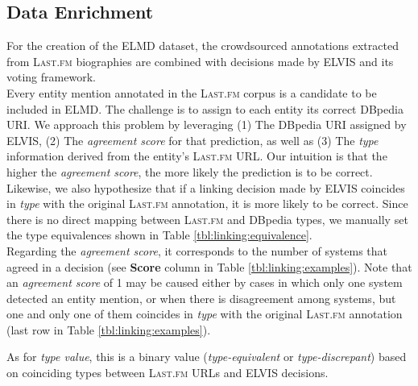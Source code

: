 


\subsection{Data Enrichment}
\label{sec:linking:enrichment}

For the creation of the ELMD dataset, the crowdsourced annotations extracted from \textsc{Last.fm} biographies are combined with decisions made by \textsc{ELVIS} and its voting framework.\\%

Every entity mention annotated in the \textsc{Last.fm} corpus is a candidate to be included in \textsc{ELMD}. The challenge is to assign to each entity its correct DBpedia URI. We approach this problem by leveraging (1) The DBpedia URI assigned by \textsc{ELVIS}, (2) The \textit{agreement score} for that prediction, as well as (3) The \textit{type} information derived from the entity's \textsc{Last.fm} URL. Our intuition is that the higher the \textit{agreement score}, the more likely the prediction is to be correct. Likewise, we also hypothesize that if a linking decision made by \textsc{ELVIS} coincides in \textit{type} with the original \textsc{Last.fm} annotation, it is more likely to be correct. Since there is no direct mapping between \textsc{Last.fm} and DBpedia types, we manually set the type equivalences shown in Table \ref{tbl:linking:equivalence}.\\

Regarding the \textit{agreement score}, it corresponds to the number of systems that agreed in a decision (see \textbf{Score} column in Table \ref{tbl:linking:examples}). Note that an \textit{agreement score} of 1 may be caused either by cases in which only one system detected an entity mention, or when there is disagreement among systems, but one and only one of them coincides in \textit{type} with the original \textsc{Last.fm} annotation (last row in Table \ref{tbl:linking:examples}).

As for \textit{type value}, this is a binary value (\textit{type-equivalent} or \textit{type-discrepant}) based on coinciding types between \textsc{Last.fm} URLs and \textsc{ELVIS} decisions.

